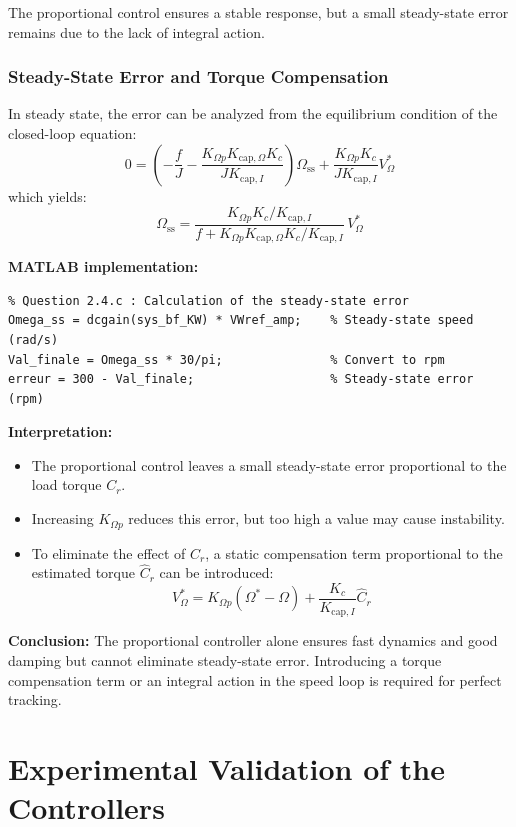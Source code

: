 \documentclass{rapportCS}
\begin{document}
The proportional control ensures a stable response, but a small steady-state error remains due to the lack of integral action.
\subsubsection{Steady-State Error and Torque Compensation}

In steady state, the error can be analyzed from the equilibrium condition of the closed-loop equation:
\[
0 = 
\left(-\frac{f}{J} - \frac{K_{\Omega p}K_{\mathrm{cap},\Omega}K_c}{J K_{\mathrm{cap},I}}\right)\Omega_{\mathrm{ss}}
+ \frac{K_{\Omega p} K_c}{J K_{\mathrm{cap},I}} V_{\Omega}^*
\]
which yields:
\[
\Omega_{\mathrm{ss}} =
\frac{K_{\Omega p} K_c / K_{\mathrm{cap},I}}{f + K_{\Omega p} K_{\mathrm{cap},\Omega} K_c / K_{\mathrm{cap},I}} \, V_{\Omega}^*
\]

\noindent\textbf{MATLAB implementation:}
\begin{verbatim}
% Question 2.4.c : Calculation of the steady-state error
Omega_ss = dcgain(sys_bf_KW) * VWref_amp;    % Steady-state speed (rad/s)
Val_finale = Omega_ss * 30/pi;               % Convert to rpm
erreur = 300 - Val_finale;                   % Steady-state error (rpm)
\end{verbatim}

\noindent\textbf{Interpretation:}
\begin{itemize}
    \item The proportional control leaves a small steady-state error proportional to the load torque $C_r$.
    \item Increasing $K_{\Omega p}$ reduces this error, but too high a value may cause instability.
    \item To eliminate the effect of $C_r$, a static compensation term proportional to the estimated torque $\hat{C}_r$ can be introduced:
    \[
    V_{\Omega}^* = K_{\Omega p}(\Omega^* - \Omega) + \frac{K_c}{K_{\mathrm{cap},I}} \hat{C}_r
    \]
\end{itemize}

\noindent\textbf{Conclusion:}
The proportional controller alone ensures fast dynamics and good damping but cannot eliminate steady-state error.  
Introducing a torque compensation term or an integral action in the speed loop is required for perfect tracking.

\newpage

\section{Experimental Validation of the Controllers}
\end{document}
